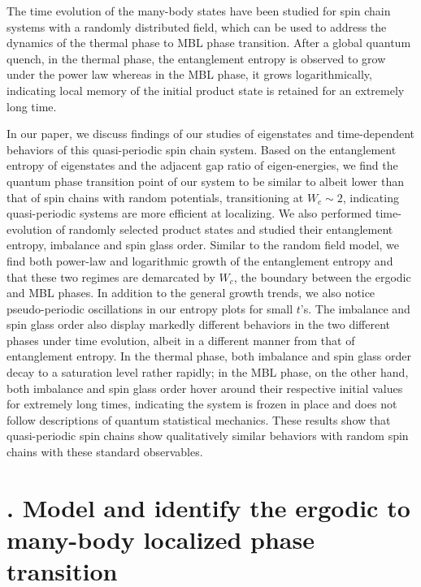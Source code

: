 \documentclass[prl,aps,epsf,showpacs,twocolumn]{revtex4}
\let\oldsection\section
\renewcommand{\section}[1]{\stepcounter{section}\oldsection{\Roman{section}. #1}}
\begin{document}
The time evolution of the many-body states have been studied for spin chain
systems with a randomly distributed field\cite{kjall2014,luitz2016time}, which
can be used to address the dynamics of the thermal phase to MBL phase
transition\cite{nandkishore2015,vosk_theory2014,potter2015}.
After a global quantum quench, in the thermal phase, the entanglement entropy is
observed to grow under the power law whereas in the MBL phase, it grows
logarithmically, indicating local memory of the initial product state is
retained for an extremely long time.

In our paper, we discuss findings of our studies of eigenstates and
time-dependent behaviors of this quasi-periodic spin chain system.
Based on the entanglement entropy of eigenstates and the adjacent gap ratio of
eigen-energies, we find the quantum phase transition point of our system to be
similar to albeit lower than that of spin chains with random potentials,
transitioning at $W_c \sim 2$, indicating quasi-periodic systems are more
efficient at localizing.
We also performed time-evolution of randomly selected product states and studied
their entanglement entropy, imbalance and spin glass order.
Similar to the random field model, we find both power-law and logarithmic growth
of the entanglement entropy and that these two regimes are demarcated by
$W_c$, the boundary between the ergodic and MBL phases.
In addition to the general growth trends, we also notice pseudo-periodic
oscillations in our entropy plots for small $t$'s.
The imbalance and spin glass order also display markedly different behaviors in
the two different phases under time evolution, albeit in a different manner from
that of entanglement entropy.
In the thermal phase, both imbalance and spin glass order decay to a saturation
level rather rapidly; in the MBL phase, on the other hand, both imbalance and
spin glass order hover around their respective initial values for extremely long
times, indicating the system is frozen in place and does not follow descriptions
of quantum statistical mechanics.
These results show that quasi-periodic spin chains show qualitatively similar
behaviors with random spin chains with these standard observables.

\section{Model and identify the ergodic to many-body localized phase transition}
\end{document}
